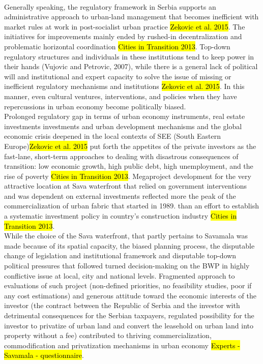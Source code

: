 \documentclass[11pt]{report}
\begin{document}
\\
Generally speaking, the regulatory framework in Serbia supports an administrative approach to urban-land management that becomes inefficient with market rules at work in post-socialist urban practice \hl{Zekovic et al. 2015}.
The initiatives for improvements mainly ended by rushed-in decentralization and problematic horizontal coordination
\hl{Cities in Transition 2013}.
Top-down regulatory structures and individuals in these institutions tend to keep power in their hands (Vujovic and Petrovic, 2007), while there is a general lack of political will and institutional and expert capacity to solve the issue of missing or inefficient regulatory mechanisms and institutions \hl{Zekovic et al. 2015}.
In this manner, even cultural ventures, interventions, and policies when they have repercussions in urban economy become politically biased.
\\
Prolonged regulatory gap in terms of urban economy instruments, real estate investments investments and urban development mechanisms and the global economic crisis deepened in the local contexts of SEE (South Eastern Europe)\hl{Zekovic et al. 2015} put forth the appetites of the private investors as the fast-lane, short-term approaches to dealing with disastrous consequences of transition: low economic growth, high public debt, high unemployment, and the rise of poverty \hl{Cities in Transition 2013}.
Megaproject development for the very attractive location at Sava waterfront that relied on government interventions and was dependent on external investments reflected more the peak of the commercialization of urban fabric that started in 1989. \cite{Hirt 2009} than an effort to establish a systematic investment policy in country's construction industry \hl{Cities in Transition 2013}.
\\
While the choice of the Sava waterfront, that partly pertains to Savamala was made because of its spatial capacity, the biased planning process, the disputable change of legislation and institutional framework and disputable top-down political pressures that followed turned decision-making on the BWP in highly conflictive issue at local, city and national levels.
Fragmented approach to evaluations of such project (non-defined priorities, no feasibility studies, poor if any cost estimations) and generous attitude toward the economic interests of the investor (the contract between the Republic of Serbia and the investor with detrimental consequences for the Serbian taxpayers, regulated possibility for the investor to privatize of urban land and convert the leasehold on urban land into property without a fee) contributed to thriving commercialization, commodification and privatization mechanisms in urban economy \hl{Experts - Savamala - questionnaire}.
\end{document}
